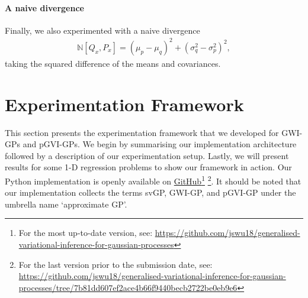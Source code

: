 \documentclass{article}
\numberwithin{equation}{section}
\begin{document}
\paragraph{A naive divergence}Finally, we also experimented with a naive divergence
\begin{align}
    \mathbb{N} \left[Q_{x}, P_{x}\right] = \left(\mu_p - \mu_q\right)^2 + \left(\sigma_q^2-\sigma_p^2\right)^2,
\end{align}
taking the squared difference of the means and covariances.

\newpage
\section{Experimentation Framework}\label{section:experimentation-framework}
This section presents the experimentation framework that we developed for GWI-GPs and pGVI-GPs.
We begin by summarising our implementation architecture followed by a description of our experimentation setup.
Lastly, we will present results for some 1-D regression problems to show our framework in action.
Our Python implementation is openly available on \href{https://github.com/jswu18/generalised-variational-inference-for-gaussian-processes}{GitHub}\footnote{For the most up-to-date version, see: \href{https://github.com/jswu18/generalised-variational-inference-for-gaussian-processes}{https://github.com/jswu18/generalised-variational-inference-for-gaussian-processes}} 
\footnote{
For the last version prior to the submission date, see: \href{https://github.com/jswu18/generalised-variational-inference-for-gaussian-processes/tree/7b81dd607ef2ace4b66f9440becb2722be0eb9e6}{https://github.com/jswu18/generalised-variational-inference-for-gaussian-processes/tree/7b81dd607ef2ace4b66f9440becb2722be0eb9e6}}. 
It should be noted that our implementation collects the terms svGP, GWI-GP, and pGVI-GP under the umbrella name `approximate GP'.
\end{document}
